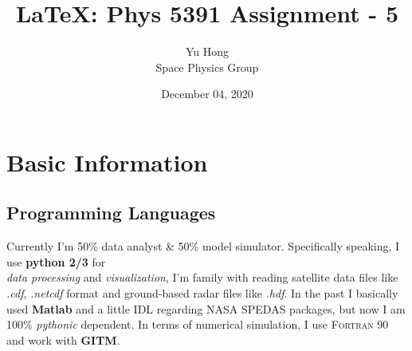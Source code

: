 \documentclass[12pt, letterpaper]{article} %
\begin{document}
\title{\LaTeX: Phys 5391 Assignment - 5} %
\author{Yu Hong\\Space Physics Group} %
\date{December 04, 2020}  %
\maketitle %
\newpage %
\tableofcontents %
\newpage %
\linenumbers %





\section{Basic Information} %
\subsection{Programming Languages} %
Currently I'm 50\% data \vspace{3mm} analyst \& 50\% model \hspace{5mm} simulator. %
Specifically speaking, I use \textbf{python 2/3} for  \\ %
\textit{data processing} and \emph{visualization}, I'm family with  %
reading satellite data files like \textit{.cdf}, \textit{.netcdf} format and ground-based radar files like \textit{.hdf}. 
In the past I basically used \textbf{Matlab} and a little \textsf{IDL} regarding NASA SPEDAS packages, but now I 
am 100\% \textit{pythonic} dependent. In terms of numerical simulation, I use \textsc{Fortran 90} and work with \textbf{GITM}. 
\end{document}
